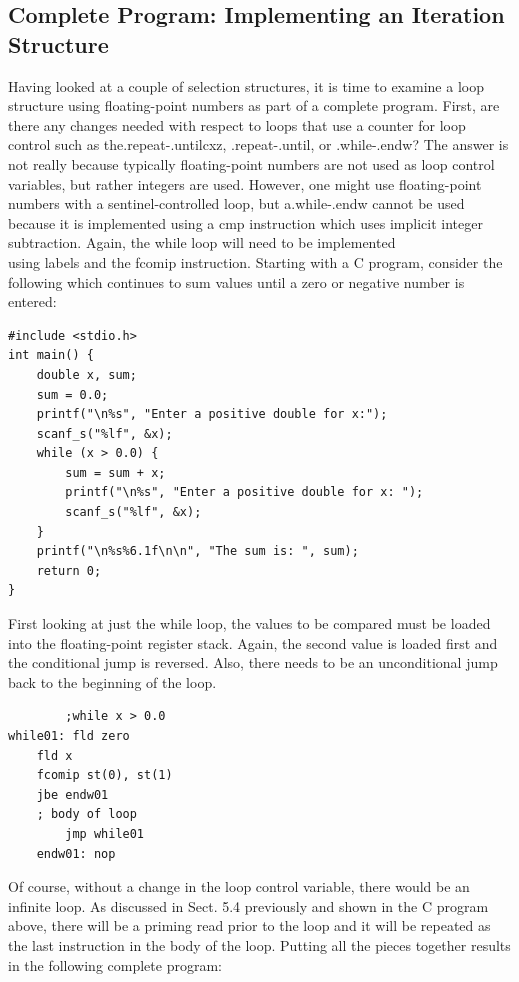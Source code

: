 \documentclass[10pt]{book}
\begin{document}
\subsection{Complete Program: Implementing an Iteration Structure}
Having looked at a couple of selection structures, it is time to examine a loop structure using floating-point numbers as part of a complete program. First, are there any changes needed with respect to loops that use a counter for loop control such as the.repeat-.untilcxz, .repeat-.until, or .while-.endw? The answer is not really because typically floating-point numbers are not used as loop control variables, but rather integers are used. However, one might use floating-point numbers with a sentinel-controlled loop, but a.while-.endw cannot be used because it is implemented using a cmp instruction which uses implicit integer subtraction. Again, the while loop will need to be implemented\\
using labels and the fcomip instruction. Starting with a C program, consider the following which continues to sum values until a zero or negative number is entered:
\begin{verbatim}
#include <stdio.h>
int main() {
    double x, sum;
    sum = 0.0;
    printf("\n%s", "Enter a positive double for x:");
    scanf_s("%lf", &x);
    while (x > 0.0) {
        sum = sum + x;
        printf("\n%s", "Enter a positive double for x: ");
        scanf_s("%lf", &x);
    }
    printf("\n%s%6.1f\n\n", "The sum is: ", sum);
    return 0;
}
\end{verbatim}

First looking at just the while loop, the values to be compared must be loaded into the floating-point register stack. Again, the second value is loaded first and the conditional jump is reversed. Also, there needs to be an unconditional jump back to the beginning of the loop.

\begin{verbatim}
        ;while x > 0.0
while01: fld zero
    fld x
    fcomip st(0), st(1)
    jbe endw01
    ; body of loop
        jmp while01
    endw01: nop
\end{verbatim}

Of course, without a change in the loop control variable, there would be an infinite loop. As discussed in Sect. 5.4 previously and shown in the C program above, there will be a priming read prior to the loop and it will be repeated as the last instruction in the body of the loop. Putting all the pieces together results in the following complete program:
\end{document}

